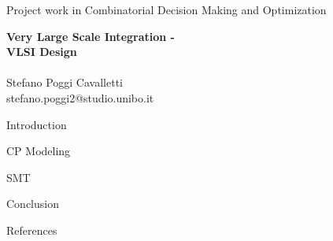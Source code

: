 \documentclass{article}
\begin{document}
\begin{center}

\Large Project work in Combinatorial Decision Making and Optimization

{\huge \bfseries Very Large Scale Integration - \\ VLSI Design}\\[0.5 cm]

\Large
\emph \\
Stefano Poggi Cavalletti
\\
stefano.poggi2@studio.unibo.it

\end{center}

\frontmatter

\tableofcontents

\newpage


{Introduction}

{CP Modeling}

{SMT}

{Conclusion}

{References}

\newpage
\printbibliography[heading = bibintoc, title = Bibliography]    %

\end{document}

